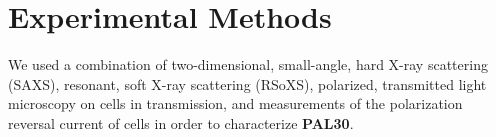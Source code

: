 \documentclass[superscriptaddress,floatfix,onecolumn,notitlepage]{revtex4-1}
\begin{document}
\author{Joseph~E.~Maclennan}

\author{Noel~A.~Clark}


\newcommand{\smapr}[1]{$\mathrm{SmAP}_\mathrm{R}$}
\newcommand{\sma}[1]{$\mathrm{SmA}$}
\newcommand{\smapf}[1]{$\mathrm{SmAP}_\mathrm{F}$}
\newcommand{\smapa}[1]{$\mathrm{SmAP}_\mathrm{A}$}
\newcommand{\smcapalp}[1]{$\mathrm{SmC}_\textrm{A}\textrm{P}_\mathrm{\alpha}$}
\newcommand{\smapalp}[1]{$\mathrm{SmAP}_\mathrm{\alpha}$}
\newcommand{\smcapf}[1]{$\mathrm{SmC}_\textrm{A}\textrm{P}_\mathrm{F}$}
\newcommand{\smcspf}[1]{$\mathrm{SmC}_\textrm{S}\textrm{P}_\mathrm{F}$}
\newcommand{\smcspa}[1]{$\mathrm{SmC}_\textrm{S}\textrm{P}_\mathrm{A}$}
\newcommand{\smchph}[1]{$\mathrm{Sm(CP)}_\alpha$}

\newcommand{\smcrpr}[1]{$\text{de Vries SmA}$}

\newcommand{\smchphM}[1]{\mathrm{Sm(CP)}_\alpha}
\newcommand{\smcdpd}[1]{$\mathrm{SmC}_\textrm{D}\textrm{P}_\mathrm{D}$}
\newcommand{\smcdpdM}[1]{\mathrm{SmC}_\textrm{D}\textrm{P}_\mathrm{D}}
\newcommand{\smcapa}[1]{$\mathrm{SmC}_\textrm{A}\textrm{P}_\mathrm{A}$}
\newcommand{\smcapaprime}[1]{$\mathrm{SmC}_\textrm{A}\textrm{P}_\mathrm{A'}$}
\newcommand{\smaprM}[1]{\mathrm{SmAP}_\mathrm{R}}
\newcommand{\smaM}[1]{\mathrm{SmA}}
\newcommand{\smapfM}[1]{\mathrm{SmAP}_\mathrm{F}}
\newcommand{\smapaM}[1]{\mathrm{SmAP}_\mathrm{A}}
\newcommand{\smapalpM}[1]{\mathrm{SmAP}_\mathrm{\alpha}}
\newcommand{\smcapfM}[1]{\mathrm{SmC}_\textrm{A}\textrm{P}_\mathrm{F}}
\newcommand{\smcspfM}[1]{\mathrm{SmC}_\textrm{S}\textrm{P}_\mathrm{F}}
\newcommand{\smcspaM}[1]{\mathrm{SmC}_\textrm{S}\textrm{P}_\mathrm{A}}
\newcommand{\smcapaM}[1]{\mathrm{SmC}_\textrm{A}\textrm{P}_\mathrm{A}}

\newcommand{\smcapaprimeM}[1]{\mathrm{SmC}_\textrm{A}\textrm{P}_\mathrm{A`}}

\newcommand{\nsix}[1]{\textbf{n-16}}
\newcommand{\nfour}[1]{\textbf{PAL30}}
\newcommand{\smcp}[2]{SmC$_\text{#1}$P$_\text{#2}$}
\newcommand{\smap}[1]{SmAP$_\text{#1}$}


\maketitle
%
\section{Experimental Methods}
We used a combination of two-dimensional, small-angle, hard X-ray scattering
(SAXS),  resonant, soft X-ray scattering (RSoXS), polarized, transmitted light microscopy on cells in transmission, and measurements of the polarization reversal current of cells in order to characterize \nfour{phi}.
\end{document}
